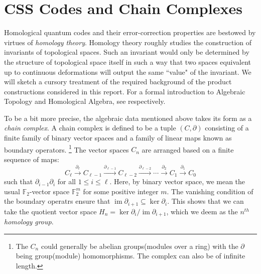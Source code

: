 \documentclass[12pt]{article}%
\DeclareMathOperator{\im}{im}
\theoremstyle{definition}
\begin{document}


\section{CSS Codes and Chain Complexes}
\hspace{\parindent}Homological quantum codes and their error-correction properties are bestowed by virtues of \emph{homology theory}. Homology theory roughly studies the construction of invariants of topological spaces. Such an invariant would only be determined by the structure of topological space itself in such a way that two spaces equivalent up to continuous deformations will output the same ``value" of the invariant. We will sketch a cursory treatment of the required background of the product constructions considered in this report. For a formal introduction to Algebraic Topology and Homological Algebra, see \cite{hatcher2005algebraic, weibel1995introduction} respectively.

To be a bit more precise, the algebraic data mentioned above takes its form as a \emph{chain complex}. A chain complex is defined to be a tuple $(C, \partial)$ consisting of a finite family of binary vector spaces and a family of linear maps known as boundary operators. \footnote{The $C_n$ could generally be abelian groups(modules over a ring) with the $\partial$ being group(module) homomorphisms. The complex can also be of infinite length.} The vector spaces $C_n$ are arranged based on a finite sequence of maps:
%
\[ C_{\ell} \xrightarrow{\partial_\ell} C_{\ell - 1} \xrightarrow{\partial_{\ell-1}} C_{\ell - 2} \xrightarrow{\partial_{\ell -2}} \cdots \xrightarrow{\partial_2} C_{1} \xrightarrow{\partial_1} C_0   \]
%
such that $\partial_{i-1}\partial_{i}$ for all $1 \leq i \leq \ell$. Here, by binary vector space, we mean the usual $\mathbb{F}_2$-vector space $\mathbb{F}_2^m$ for some positive integer $m$. The vanishing condition of the boundary operatrs ensure that $\im \partial_{i+1} \subseteq \ker \partial_{i}$. This shows that we can take the quotient vector space $H_n = \ker \partial_{i} / \im \partial_{i+1}$, which we deem as the \emph{$n^{th}$ homology group}. 
\end{document}
